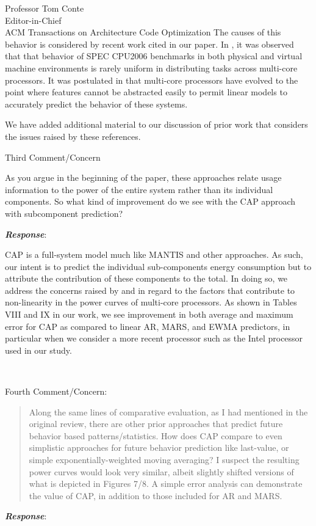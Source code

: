\documentclass[10pt]{letter} %
\newenvironment{rviewcomment}
{~\\%
\begin{bfseries}}
{\end{bfseries}}
\newcommand{\rviewresponse}{\textbf{\textit{Response}}:}
\begin{document}
\begin{letter}{Professor Tom Conte \\
Editor-in-Chief \\
ACM Transactions on Architecture Code Optimization }
The causes of this behavior is considered by recent work cited in our
paper. In \cite{Kansal2010}, it was
observed that that behavior of SPEC CPU2006 benchmarks in both physical
and virtual machine environments is rarely uniform in distributing tasks
across multi-core processors.  It was postulated in
\cite{McCullough2011} that multi-core processors have evolved to the
point where features cannot be abstracted easily to permit linear models
to accurately predict the behavior of these systems.

We have added additional material to our discussion of prior work
that considers the issues raised by these references.
\newpage
\begin{rviewcomment}
  Third Comment/Concern
\end{rviewcomment}

\begin{itshape}
  As you argue in the beginning of the paper, these approaches relate
  usage information to the power of the entire system rather than its
  individual components. So what kind of improvement do we see with the
  CAP approach with subcomponent prediction?
\end{itshape}

\rviewresponse 

CAP is a full-system model much like MANTIS and other
approaches.  As such, our intent is to predict the individual
sub-components energy consumption but to attribute the contribution of
these components to the total.  In doing so, we address the concerns
raised by \cite{Kansal2010} and \cite{McCullough2011} in regard to the
factors that contribute to non-linearity in the power curves of
multi-core processors.  As shown in Tables VIII and IX in our work, we
see improvement in both average and maximum error for CAP as compared to
linear AR, MARS, and EWMA predictors, in particular when we consider a
more recent processor such as the Intel processor used in our study.

\begin{rviewcomment}
  Fourth Comment/Concern:
\end{rviewcomment}
\begin{quote}
  \begin{itshape}
    Along the same lines of comparative evaluation, as I had mentioned
    in the original review, there are other prior approaches that
    predict future behavior based patterns/statistics. How does CAP
    compare to even simplistic approaches for future behavior prediction
    like last-value, or simple exponentially-weighted moving averaging?
    I suspect the resulting power curves would look very similar, albeit
    slightly shifted versions of what is depicted in Figures 7/8. A
    simple error analysis can demonstrate the value of CAP, in addition
    to those included for AR and MARS.
  \end{itshape}
\end{quote}
\rviewresponse


\end{letter}
\end{document}
